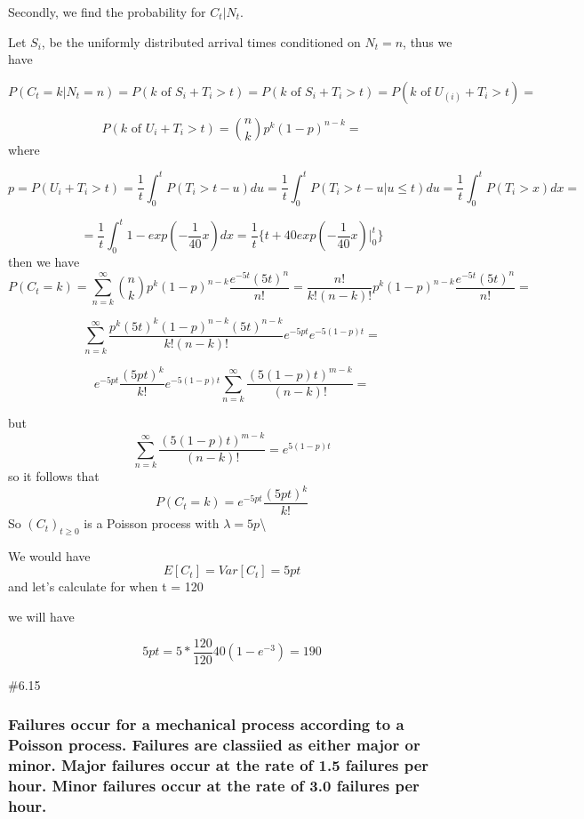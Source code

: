 \documentclass[]{article}
\begin{document}
Secondly, we find the probability for \(C_t | N_t\).

Let \(S_i\), be the uniformly distributed arrival times conditioned on
\(N_t = n\), thus we have

\[
P(C_t = k | N_t = n) = P(k \text{ of } S_i + T_i > t) = P(k \text{ of } S_i + T_i > t)  = P(k \text{ of } U_{(i)} + T_i > t)  = 
\]

\[
P(k \text{ of } U_i + T_i > t)  = {n\choose k} p^k (1-p)^{n-k}  =
\] where

\[
p =  P(U_i + T_i > t) = \frac{1}{t}\int_{0}^t P(T_i > t - u) du = \frac{1}{t}\int_{0}^t P( T_i > t-u |  u \leq t) du = \frac{1}{t}\int_{0}^t P(T_i > x) dx =
\]

\[
= 
\frac{1}{t} \int_{0}^t 1 - exp(-\frac{1}{40}x) dx = \frac{1}{t} \{ t +40exp(-\frac{1}{40}x) \bigg |^t _0\}
\] then we have \[
P(C_t = k) = \sum_{n=k}^\infty{n\choose k} p^k (1-p)^{n-k}  \frac{e^{-5t}(5t)^n}{n!} = \frac{n!}{k!(n-k)!} p^k (1-p)^{n-k}  \frac{e^{-5t}(5t)^n}{n!} =
\]

\[
\sum_{n=k}^\infty \frac{p^k(5t)^k (1-p)^{n-k} (5t)^{n-k}}{k!(n-k)!} e^{-5pt} e^{-5(1-p)t} =
\]

\[
e^{-5pt}\frac{(5pt)^k}{k!} e^{-5(1-p)t} \sum_{n=k}^\infty \frac{(5(1-p)t)^{m-k}}{(n-k)!} = 
\]

but \[
\sum_{n=k}^\infty \frac{(5(1-p)t)^{m-k}}{(n-k)!} = e^{5(1-p)t}
\] so it follows that \[
P(C_t = k) = e^{-5pt}\frac{(5pt)^k}{k!}
\] So \((C_t)_{t \geq 0}\) is a Poisson process with
\(\lambda = 5p\)\textbackslash{}

We would have \[
E[C_t] = Var[C_t] = 5pt
\] and let's calculate for when t = 120

we will have

\[
5pt= 5* \frac{120}{120}40(1-e^{-3})=190
\]

\#6.15

\hypertarget{failures-occur-for-a-mechanical-process-according-to-a-poisson-process.-failures-are-classiied-as-either-major-or-minor.-major-failures-occur-at-the-rate-of-1.5-failures-per-hour.-minor-failures-occur-at-the-rate-of-3.0-failures-per-hour.}{%
\subsubsection{Failures occur for a mechanical process according to a
Poisson process. Failures are classiied as either major or minor. Major
failures occur at the rate of 1.5 failures per hour. Minor failures
occur at the rate of 3.0 failures per
hour.}\label{failures-occur-for-a-mechanical-process-according-to-a-poisson-process.-failures-are-classiied-as-either-major-or-minor.-major-failures-occur-at-the-rate-of-1.5-failures-per-hour.-minor-failures-occur-at-the-rate-of-3.0-failures-per-hour.}}
\end{document}
